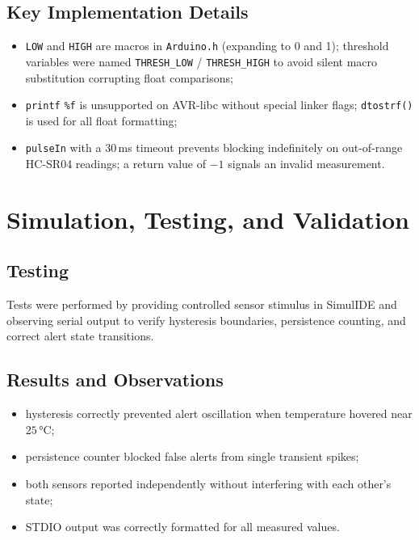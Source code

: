 \documentclass[12pt,a4paper]{article}
\begin{document}
\subsection{Key Implementation Details}
\begin{itemize}
    \item \texttt{LOW} and \texttt{HIGH} are macros in \texttt{Arduino.h} (expanding to 0 and 1);
          threshold variables were named \texttt{THRESH\_LOW} / \texttt{THRESH\_HIGH} to avoid
          silent macro substitution corrupting float comparisons;
    \item \texttt{printf} \texttt{\%f} is unsupported on AVR-libc without special linker flags;
          \texttt{dtostrf()} is used for all float formatting;
    \item \texttt{pulseIn} with a 30\,ms timeout prevents blocking indefinitely on out-of-range
          HC-SR04 readings; a return value of $-1$ signals an invalid measurement.
\end{itemize}

\section{Simulation, Testing, and Validation}

\subsection{Testing}
Tests were performed by providing controlled sensor stimulus in SimulIDE and
observing serial output to verify hysteresis boundaries, persistence counting,
and correct alert state transitions.

\subsection{Results and Observations}
\begin{itemize}
    \item hysteresis correctly prevented alert oscillation when temperature hovered near $25$\,°C;
    \item persistence counter blocked false alerts from single transient spikes;
    \item both sensors reported independently without interfering with each other's state;
    \item STDIO output was correctly formatted for all measured values.
\end{itemize}
\end{document}
